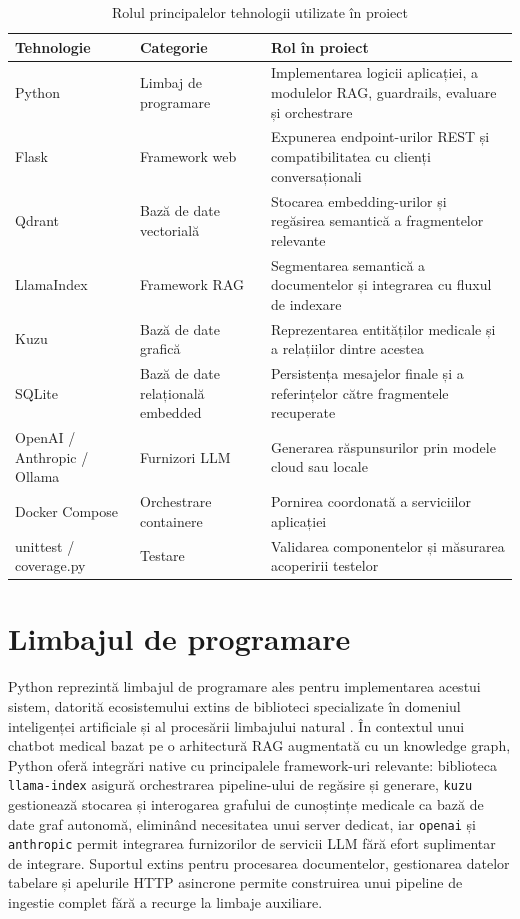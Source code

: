 \documentclass[12pt, a4paper, oneside, romanian]{teza-upb}
\begin{document}
\begin{table}[h]
\centering
\caption{Rolul principalelor tehnologii utilizate în proiect}
\begin{tabular}{|p{3cm}|p{4cm}|p{6cm}|}
\hline
\textbf{Tehnologie} & \textbf{Categorie} & \textbf{Rol în proiect} \\
\hline
Python & Limbaj de programare & Implementarea logicii aplicației, a modulelor RAG, guardrails, evaluare și orchestrare \\
\hline
Flask & Framework web & Expunerea endpoint-urilor REST și compatibilitatea cu clienți conversaționali \\
\hline
Qdrant & Bază de date vectorială & Stocarea embedding-urilor și regăsirea semantică a fragmentelor relevante \\
\hline
LlamaIndex & Framework RAG & Segmentarea semantică a documentelor și integrarea cu fluxul de indexare \\
\hline
Kuzu & Bază de date grafică & Reprezentarea entităților medicale și a relațiilor dintre acestea \\
\hline
SQLite & Bază de date relațională embedded & Persistența mesajelor finale și a referințelor către fragmentele recuperate \\
\hline
OpenAI / Anthropic / Ollama & Furnizori LLM & Generarea răspunsurilor prin modele cloud sau locale \\
\hline
Docker Compose & Orchestrare containere & Pornirea coordonată a serviciilor aplicației \\
\hline
unittest / coverage.py & Testare & Validarea componentelor și măsurarea acoperirii testelor \\
\hline
\end{tabular}
\end{table}

\section{Limbajul de programare}

Python reprezintă limbajul de programare ales pentru implementarea acestui sistem,
datorită ecosistemului extins de biblioteci specializate în domeniul inteligenței
artificiale și al procesării limbajului natural \cite{srinath2017python, llm_review_2024}. În contextul unui
chatbot medical bazat pe o arhitectură RAG augmentată cu un knowledge graph,
Python oferă integrări native cu principalele framework-uri relevante: biblioteca
\texttt{llama-index} asigură orchestrarea pipeline-ului de regăsire și generare,
\texttt{kuzu} gestionează stocarea și interogarea grafului de cunoștințe medicale
ca bază de date graf autonomă, eliminând necesitatea unui server dedicat, iar
\texttt{openai} și \texttt{anthropic} permit integrarea furnizorilor de servicii
LLM fără efort suplimentar de integrare. Suportul extins pentru procesarea
documentelor, gestionarea datelor tabelare și apelurile HTTP asincrone permite
construirea unui pipeline de ingestie complet fără a recurge la limbaje auxiliare.
\end{document}
